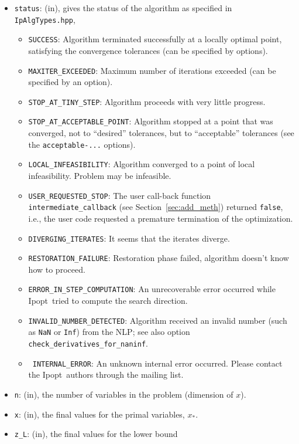 \documentclass[10pt]{article}
\newcommand{\Ipopt}{{\sc Ipopt}}
\begin{document}
\begin{itemize}
\item {\tt status}: (in), gives the status of the algorithm as
  specified in {\tt IpAlgTypes.hpp},
  \begin{itemize}
  \item {\tt SUCCESS}: Algorithm terminated successfully at a locally
    optimal point, satisfying the convergence tolerances (can be
    specified by options).
  \item {\tt MAXITER\_EXCEEDED}: Maximum number of iterations exceeded
    (can be specified by an option).
  \item {\tt STOP\_AT\_TINY\_STEP}: Algorithm proceeds with very
    little progress.
  \item {\tt STOP\_AT\_ACCEPTABLE\_POINT}: Algorithm stopped at a
    point that was converged, not to ``desired'' tolerances, but to
    ``acceptable'' tolerances (see the {\tt acceptable-...} options).
  \item {\tt LOCAL\_INFEASIBILITY}: Algorithm converged to a point of
    local infeasibility. Problem may be infeasible.
  \item {\tt USER\_REQUESTED\_STOP}: The user call-back function {\tt
      intermediate\_callback} (see Section~\ref{sec:add_meth})
    returned {\tt false}, i.e., the user code requested a premature
    termination of the optimization.
  \item {\tt DIVERGING\_ITERATES}: It seems that the iterates diverge.
  \item {\tt RESTORATION\_FAILURE}: Restoration phase failed,
    algorithm doesn't know how to proceed.
  \item {\tt ERROR\_IN\_STEP\_COMPUTATION}: An unrecoverable error
    occurred while \Ipopt\ tried to compute the search direction.
  \item {\tt INVALID\_NUMBER\_DETECTED}:  Algorithm received an
    invalid number (such as {\tt NaN} or {\tt Inf}) from the NLP; see
    also option {\tt check\_derivatives\_for\_naninf}.
  \item {\tt
      INTERNAL\_ERROR}: An unknown internal error occurred.  Please
    contact the \Ipopt\ authors through the mailing list.
  \end{itemize}
\item {\tt n}: (in), the number of variables in the problem (dimension
  of $x$).
\item {\tt x}: (in), the final values for the primal variables, $x_*$.
\item {\tt z\_L}: (in), the final values for the lower bound

\end{itemize}
\end{document}

